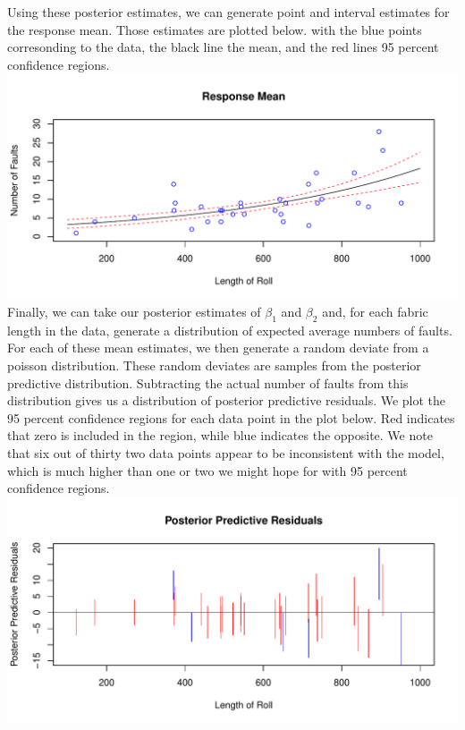 \documentclass[12pt]{article}
\begin{document}
\begin{enumerate}[(a)]
\newline
Using these posterior estimates, we can generate point and interval estimates for the response mean. Those estimates are plotted below. with the blue points corresonding to the data, the black line the mean, and the red lines 95 percent confidence regions. \\
\newline
\includegraphics[scale = .7]{plot3.pdf} \\
\newline
Finally, we can take our posterior estimates of $\beta_1$ and $\beta_2$ and, for each fabric length in the data, generate a distribution of expected average numbers of faults. For each of these mean estimates, we then generate a random deviate from a poisson distribution. These random deviates are samples from the posterior predictive distribution. Subtracting the actual number of faults from this distribution gives us a distribution of posterior predictive residuals. We plot the 95 percent confidence regions for each data point in the plot below. Red indicates that zero is included in the region, while blue indicates the opposite. We note that six out of thirty two data points appear to be inconsistent with the model, which is much higher than one or two we might hope for with 95 percent confidence regions. \\
\newline
\includegraphics[scale = .7]{plot4.pdf} \\
\newline


\end{enumerate}
\end{document}
